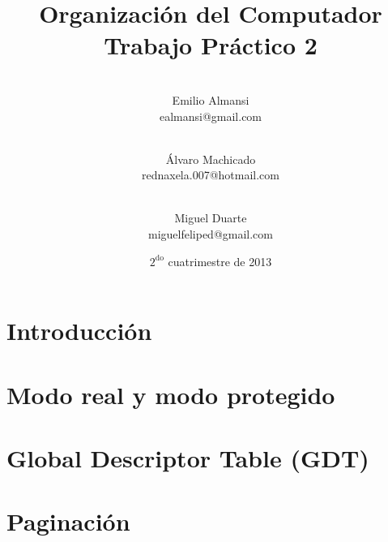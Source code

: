 \documentclass[10pt, a4paper]{article}
\newcommand{\RNum}[1]{\uppercase\expandafter{\romannumeral #1\relax}}
\begin{document}
\setlength{\parindent}{25pt}

	
	\thispagestyle{empty}
	\title{%
	\huge{Organización del Computador \RNum{2}}\\
	\vspace{4mm}
	\large{Trabajo Práctico 2}
	}
	\date{\vspace{5mm}$2^{\mathrm{do}}$ cuatrimestre de 2013}

	\author{
		\\
		{\rm Emilio Almansi }\\
		\small{ealmansi@gmail.com}
		\and
		\\
		{\rm Álvaro Machicado }\\
		\small{rednaxela.007@hotmail.com}
		\and
		\\
		{\rm Miguel Duarte}\\
		\small{miguelfeliped@gmail.com}
	} %
	\maketitle

	
	\vspace{10mm}
	\begin{abstract}
	\end{abstract}
	\vspace{10mm}


	\tableofcontents

	\clearpage
	\section{Introducción}
		
	\clearpage

	\section{Modo real y modo protegido}
		
	\clearpage

	\section{Global Descriptor Table (GDT)}
		
	\clearpage

	\section{Paginación}
		
	\clearpage
\end{document}
